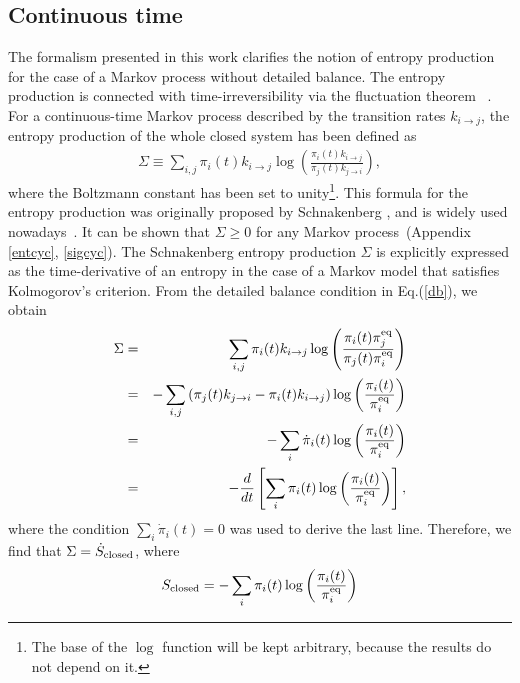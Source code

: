 \documentclass[aps,pre,amsmath,amssymb,floatfix,preprint,nofootinbib]{revtex4}
\begin{document}
\subsection{Continuous time}
The formalism presented in this work clarifies the notion of entropy production~\cite{QHx1,QHx2,hi12,zmh,hi11,jap,hi12a,hi13a,seif1,seif2,sch,AG,tom1,tom2,zia1,zia2} for the case of a Markov process without detailed balance. The entropy production is connected with time-irreversibility via the fluctuation theorem~\cite{evan,gc,kurc,lebo,crooks,maes,seif1,seif2,gj,episto,no,park,kaw,hi13}  . For a continuous-time Markov process described by the transition rates $k_{i \to j}$, the entropy production of the whole closed system has been defined as
\begin{eqnarray}
\Sigma  \equiv \sum_{i,j} \pi_i(t) k_{i \to j} \log \left(\frac{ \pi_i(t) k_{i \to j}}{\pi_j(t)  k_{j \to i}} \right),\label{sch}
\end{eqnarray}
where the Boltzmann constant has been set to unity\footnote{The base of the $\log$ function will be kept arbitrary, because the results do not depend on it.}. This formula for the entropy production was  originally proposed by Schnakenberg \cite{sch}, and is widely used nowadays~\cite{QHx1,QHx2,hi12,zmh,hi11,jap,hi12a,hi13a,seif1,seif2,AG,tom1,tom2,zia1,zia2}.
It can be shown that $\Sigma  \ge 0$ for any Markov process~(Appendix \ref{entcyc}, \ref{sigcyc}). The Schnakenberg entropy production $\Sigma$ is explicitly expressed as the time-derivative of an entropy in the case of a Markov model that satisfies Kolmogorov's criterion.  From the detailed balance condition in Eq.(\ref{db}), we obtain
\begin{eqnarray}
\Sigma &=& \sum_{i,j} \pi_i(t) k_{i \to j} \log \left(\frac{ \pi_i(t) \pi^{\rm eq}_j}{\pi_j(t)  \pi^{\rm eq}_i} \right)\nonumber\\
&=& -\sum_{i,j} \left( \pi_j(t) k_{j \to i} - \pi_i(t) k_{i \to j} \right) \log \left(\frac{ \pi_i(t) }{\pi^{\rm eq}_i} \right)\nonumber\\
&=& -\sum_{i} \dot \pi_i(t) \log \left(\frac{ \pi_i(t) }{\pi^{\rm eq}_i} \right)\nonumber\\
&=& -\frac{d}{dt}\left[ \sum_{i} \pi_i(t) \log \left(\frac{ \pi_i(t) }{\pi^{\rm eq}_i} \right) \right],\label{sig1}
\end{eqnarray}
where the condition $\sum_i \dot \pi_i(t) = 0$ was used to derive the last line. Therefore, we find that $\Sigma = \dot S_{\rm closed}$, where 
\begin{equation}
S_{\rm closed} = -\sum_i \pi_i(t) \log \left(\frac{\pi_i(t)}{\pi^{\rm eq}_i}\right) \label{tot}
\end{equation}
\end{document}
